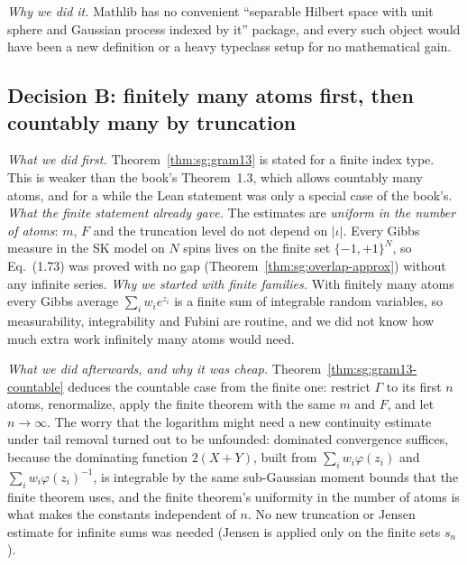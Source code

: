 \emph{Why we did it.} Mathlib has no convenient ``separable Hilbert space with unit sphere and Gaussian process indexed by it'' package, and every such object would have been a new definition or a heavy typeclass setup
for no mathematical gain.

\subsection*{Decision B: finitely many atoms first, then countably many by truncation}

\emph{What we did first.} Theorem~\ref{thm:sg:gram13} is stated for a finite index type. This is weaker than the book's Theorem~1.3, which allows countably many atoms, and for a while the Lean statement was only a special case of the book's.
\emph{What the finite statement already gave.} The estimates are \emph{uniform in the number of atoms}: $m$, $F$ and the truncation level do not depend on $|\iota|$. Every Gibbs measure in the SK model on $N$ spins lives on the finite set $\{-1,+1\}^N$, so Eq.~(1.73) was proved with no gap (Theorem~\ref{thm:sg:overlap-approx}) without any infinite series.
\emph{Why we started with finite families.} With finitely many atoms every Gibbs average $\sum_iw_ie^{z_i}$ is a finite sum of integrable random variables, so measurability, integrability and Fubini are routine, and we did not know how much extra work infinitely many atoms would need.

\emph{What we did afterwards, and why it was cheap.} Theorem~\ref{thm:sg:gram13-countable} deduces the countable case from the finite one: restrict $\Gamma$ to its first $n$ atoms, renormalize, apply the finite theorem with the same $m$ and $F$, and let $n\to\infty$. The worry that the logarithm might need a new continuity estimate under tail removal turned out to be unfounded: dominated convergence suffices, because the dominating function $2(X+Y)$, built from $\sum_iw_i\varphi(z_i)$ and $\sum_iw_i\varphi(z_i)^{-1}$, is integrable by the same sub-Gaussian moment bounds that the finite theorem uses, and the finite theorem's uniformity in the number of atoms is what makes the constants independent of $n$. No new truncation or Jensen estimate for infinite sums was needed (Jensen is applied only on the finite sets $s_n$).

